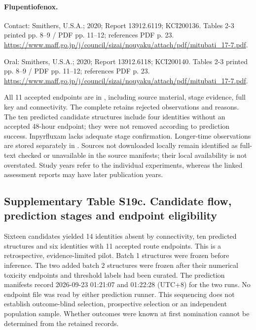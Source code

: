 \paragraph{Flupentiofenox.}

Contact: Smithers, U.S.A.; 2020; Report 13912.6119; KCI200136. Tables 2-3 printed pp. 8--9 / PDF pp. 11--12; references PDF p. 23. \url{https://www.maff.go.jp/j/council/sizai/nouyaku/attach/pdf/mitubati_17-7.pdf}.

Oral: Smithers, U.S.A.; 2020; Report 13912.6118; KCI200140. Tables 2-3 printed pp. 8--9 / PDF pp. 11--12; references PDF p. 23. \url{https://www.maff.go.jp/j/council/sizai/nouyaku/attach/pdf/mitubati_17-7.pdf}.

All 11 accepted endpoints are in , including source material, stage evidence, full key and connectivity. The complete  retains rejected observations and reasons. The ten predicted candidate structures include four identities without an accepted 48-hour endpoint; they were not removed according to prediction success. Inpyrfluxam lacks adequate stage confirmation. Longer-time observations are stored separately in . Sources not downloaded locally remain identified as full-text checked or unavailable in the source manifests; their local availability is not overstated. Study years refer to the individual experiments, whereas the linked assessment reports may have later publication years.

\subsection*{Supplementary Table S19c. Candidate flow, prediction stages and endpoint eligibility}

Sixteen candidates yielded 14 identities absent by connectivity, ten predicted structures and six identities with 11 accepted route endpoints. This is a retrospective, evidence-limited pilot. Batch 1 structures were frozen before inference. The two added batch 2 structures were frozen after their numerical toxicity endpoints and threshold labels had been curated. The prediction manifests record 2026-09-23 01:21:07 and 01:22:28 (UTC+8) for the two runs. No endpoint file was read by either prediction runner. This sequencing does not establish outcome-blind selection, prospective selection or an independent population sample. Whether outcomes were known at first nomination cannot be determined from the retained records.

